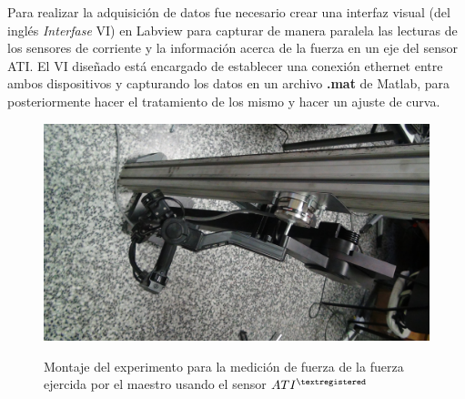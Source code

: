 Para realizar la adquisición de datos fue necesario crear una interfaz visual (del ingl\'es \textit{ Interfase} VI) en Labview para capturar de manera paralela las lecturas de los sensores de corriente y la información acerca de la fuerza en un eje del sensor ATI. El VI diseñado est\'a encargado de establecer una conexión ethernet entre ambos dispositivos y capturando los datos en un archivo \textbf{.mat} de Matlab, para posteriormente hacer el tratamiento de los mismo y hacer un ajuste de curva.\\


\begin{figure}[htb!]

\includegraphics[scale=0.12]{FiguresP/setupTorque2}\label{fig:force}
\caption{Montaje del experimento para la medición de fuerza de la fuerza ejercida por el maestro usando el sensor $ATI^{\textregistered}$}
\label{fig:montajeExperimento}
\end{figure}







